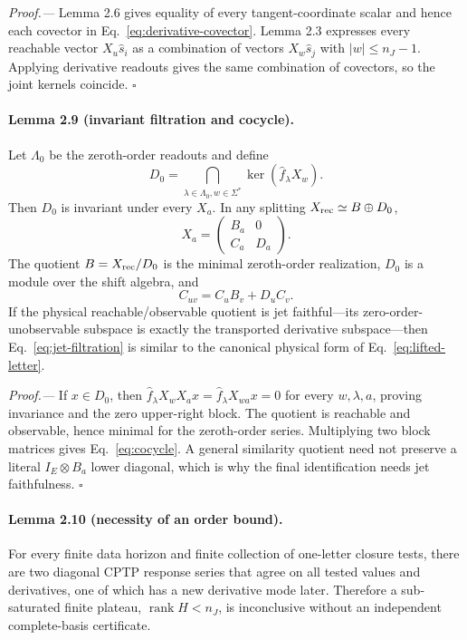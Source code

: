 \documentclass[aps,prl,onecolumn,superscriptaddress,nofootinbib]{revtex4-2}
\newcommand{\C}{\mathbb C}
\newcommand{\rank}{\operatorname{rank}}
\begin{document}
\emph{Proof.---}
Lemma 2.6 gives equality of every tangent-coordinate scalar and hence each covector in Eq.~\eqref{eq:derivative-covector}.  Lemma 2.3 expresses every reachable vector $X_u\widehat s_i$ as a combination of vectors $X_w\widehat s_j$ with $|w|\le n_J-1$.  Applying derivative readouts gives the same combination of covectors, so the joint kernels coincide. \hfill$\square$

\paragraph{Lemma 2.9 (invariant filtration and cocycle).}
Let $\Lambda_0$ be the zeroth-order readouts and define
\begin{equation}
 D_0=\bigcap_{\lambda\in\Lambda_0,w\in\Sigma^*}
 \ker(\widehat f_\lambda X_w).
 \label{eq:D0}
\end{equation}
Then $D_0$ is invariant under every $X_a$.  In any splitting $X_{\rm rec}\simeq B\oplus D_0$,
\begin{equation}
 X_a=\begin{pmatrix}B_a&0\\C_a&D_a\end{pmatrix}.
 \label{eq:jet-filtration}
\end{equation}
The quotient $B=X_{\rm rec}/D_0$ is the minimal zeroth-order realization, $D_0$ is a module over the shift algebra, and
\begin{equation}
 C_{uv}=C_uB_v+D_uC_v.
 \label{eq:cocycle}
\end{equation}
If the physical reachable/observable quotient is jet faithful---its zero-order-unobservable subspace is exactly the transported derivative subspace---then Eq.~\eqref{eq:jet-filtration} is similar to the canonical physical form of Eq.~\eqref{eq:lifted-letter}.

\emph{Proof.---}
If $x\in D_0$, then $\widehat f_\lambda X_wX_ax=\widehat f_\lambda X_{wa}x=0$ for every $w,\lambda,a$, proving invariance and the zero upper-right block.  The quotient is reachable and observable, hence minimal for the zeroth-order series.  Multiplying two block matrices gives Eq.~\eqref{eq:cocycle}.  A general similarity quotient need not preserve a literal $I_E\otimes B_a$ lower diagonal, which is why the final identification needs jet faithfulness. \hfill$\square$

\paragraph{Lemma 2.10 (necessity of an order bound).}
For every finite data horizon and finite collection of one-letter closure tests, there are two diagonal CPTP response series that agree on all tested values and derivatives, one of which has a new derivative mode later.  Therefore a sub-saturated finite plateau, $\rank H<n_J$, is inconclusive without an independent complete-basis certificate.
\end{document}
